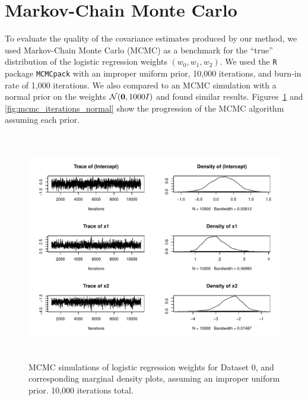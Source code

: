 
\section{Markov-Chain Monte Carlo}\label{sec:mcmc}

To evaluate the quality of the covariance estimates produced by our method, we used Markov-Chain Monte Carlo (MCMC) as a benchmark for the ``true'' distribution of the logistic regression weights $(w_0, w_1, w_2)$.  We used the \texttt{R} package \texttt{MCMCpack} with an improper uniform prior, 10,000 iterations, and burn-in rate of 1,000 iterations.  We also compared to
an MCMC simulation with a normal prior on the weights $\mathcal{N}(\boldsymbol{\mathbf{0}},1000I)$ and found similar results. Figures~\ref{fig:mcmc_iterations} and \ref{fig:mcmc_iterations_normal} show the progression of the MCMC algorithm assuming each prior.  

\begin{figure}
\centering
	\includegraphics[height=100mm]{figures/mcmc_uniform.pdf}
    \caption{MCMC simulations of logistic regression weights for Dataset 0, and corresponding marginal density plots, assuming 
    an improper uniform prior. 10,000 iterations total.}  \label{fig:mcmc_iterations}  
\end{figure}

